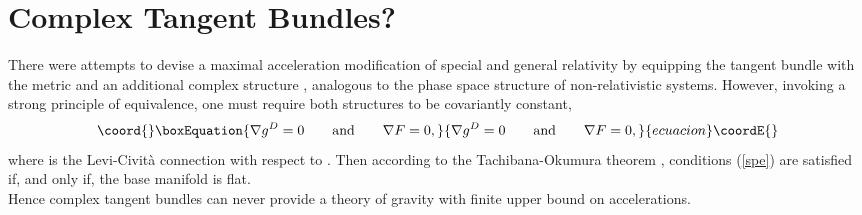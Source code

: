 \documentclass[11pt,a4paper,twoside]{article}
\begin{document}
\section{Complex Tangent Bundles?}
There were attempts \cite{Low,Brandt} to devise a maximal acceleration modification of
special and general relativity by equipping the tangent bundle with
the metric \coordHE{} and an additional complex structure \coordHE{}, analogous to
the phase space structure of non-relativistic systems. However, invoking a
strong principle of equivalence, one must require both
structures to be covariantly constant,
\begin{equation}\coord{}\boxEquation{\label{spe}
  \nabla g^D = 0 \qquad \textrm{and} \qquad \nabla F = 0,
}{\nabla g^D = 0 \qquad \textrm{and} \qquad \nabla F = 0,
}{ecuacion}\coordE{}\end{equation}
where \myHighlight{$\nabla$}\coordHE{} is the Levi-Civit\`a connection with respect to \coordHE{}.
Then according to the Tachibana-Okumura theorem \cite{TO1962}, conditions
(\ref{spe}) are satisfied if, and only if, the base manifold \coordHE{} is
flat.\\
Hence complex tangent bundles can never provide a theory of
gravity with finite upper bound on accelerations.\\
\end{document}
